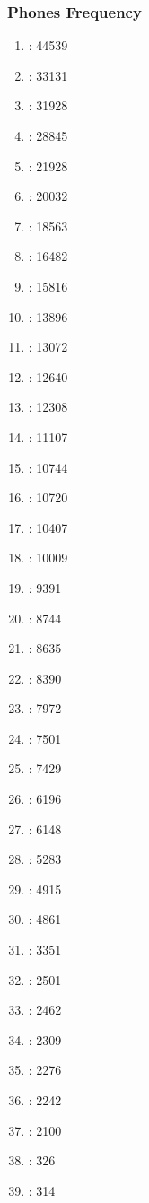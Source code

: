 \documentclass{beamer}
\begin{document}
\frame
{
  \frametitle{Phones Frequency}
\begin{multicols}{4}
\begin{enumerate}
    \item {} : 44539 
	\item {} : 33131 
	\item {} : 31928 
	\item {} : 28845 
	\item {} : 21928 
	\item {} : 20032 
	\item {} : 18563 
	\item {} : 16482 
	\item {} : 15816 
	\item {} : 13896 
	\item {} : 13072 
	\item \textipa{3\textrhoticity} : 12640 
	\item {} : 12308 
	\item {} : 11107 
	\item {} : 10744 
	\item {} : 10720 
	\item {} : 10407 
	\item {} : 10009 
	\item {} : 9391 
	\item {} : 8744 
	\item \textipa{\ae} : 8635 
	\item {} : 8390 
	\item {} : 7972 
	\item {} : 7501 
	\item {} : 7429 
	\item {} : 6196 
	\item {} : 6148 
	\item {} : 5283 
	\item {} : 4915 
	\item {} : 4861 
	\item {} : 3351 
	\item {} : 2501 
	\item {} : 2462 
	\item {} : 2309 
	\item {} : 2276 
	\item {} : 2242 
	\item {} : 2100 
	\item {} : 326 
	\item {} : 314 
\end{enumerate}
\end{multicols}
}
\end{document}
